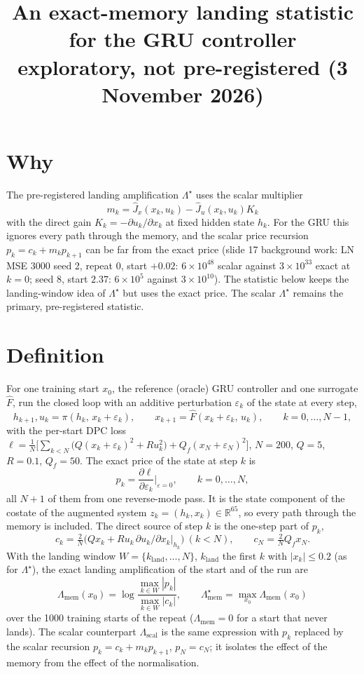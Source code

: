 \documentclass[11pt]{article}
\title{An exact-memory landing statistic for the GRU controller\\[2pt]\large exploratory, not pre-registered (3 November 2026)}
\author{}
\date{}
\begin{document}
\maketitle

\section*{Why}
The pre-registered landing amplification $\Lambda^\star$ uses the scalar multiplier
\[m_k=\hat J_x(x_k,u_k)-\hat J_u(x_k,u_k)K_k\]
with the direct gain $K_k=-\partial u_k/\partial x_k$ at fixed hidden state $h_k$. For the GRU this ignores every path through
the memory, and the scalar price recursion $p_k=c_k+m_kp_{k+1}$ can be far from the exact price (slide 17 background work:
LN MSE 3000 seed 2, repeat 0, start $+0.02$: $6\times10^{48}$ scalar against $3\times10^{33}$ exact at $k=0$; seed 8, start
$2.37$: $6\times10^{5}$ against $3\times10^{10}$). The statistic below keeps the landing-window idea of $\Lambda^\star$ but uses
the exact price. The scalar $\Lambda^\star$ remains the primary, pre-registered statistic.

\section*{Definition}
For one training start $x_0$, the reference (oracle) GRU controller and one surrogate $\hat F$, run the closed loop with an
additive perturbation $\varepsilon_k$ of the state at every step,
\[
h_{k+1},u_k=\pi(h_k,\,x_k+\varepsilon_k),\qquad x_{k+1}=\hat F(x_k+\varepsilon_k,\,u_k),\qquad k=0,\dots,N-1,
\]
with the per-start DPC loss
$\ell=\frac1N\big[\sum_{k<N}\big(Q(x_k+\varepsilon_k)^2+Ru_k^2\big)+Q_f(x_N+\varepsilon_N)^2\big]$, $N=200$, $Q=5$, $R=0.1$,
$Q_f=50$. The exact price of the state at step $k$ is
\[
p_k=\frac{\partial\ell}{\partial\varepsilon_k}\Big|_{\varepsilon=0},\qquad k=0,\dots,N,
\]
all $N+1$ of them from one reverse-mode pass. It is the state component of the costate of the augmented system
$z_k=(h_k,x_k)\in\mathbb R^{65}$, so every path through the memory is included. The direct source of step $k$ is the one-step
part of $p_k$,
\[
c_k=\tfrac2N\big(Qx_k+Ru_k\,\partial u_k/\partial x_k|_{h_k}\big)\ (k<N),\qquad c_N=\tfrac2N Q_fx_N .
\]
With the landing window $W=\{k_\mathrm{land},\dots,N\}$, $k_\mathrm{land}$ the first $k$ with $|x_k|\le0.2$ (as for
$\Lambda^\star$), the exact landing amplification of the start and of the run are
\[
\Lambda_{\mathrm{mem}}(x_0)=\log\frac{\max_{k\in W}|p_k|}{\max_{k\in W}|c_k|},\qquad
\Lambda^\star_{\mathrm{mem}}=\max_{x_0}\Lambda_{\mathrm{mem}}(x_0)
\]
over the 1000 training starts of the repeat ($\Lambda_{\mathrm{mem}}=0$ for a start that never lands). The scalar counterpart
$\Lambda_{\mathrm{scal}}$ is the same expression with $p_k$ replaced by the scalar recursion $p_k=c_k+m_kp_{k+1}$,
$p_N=c_N$; it isolates the effect of the memory from the effect of the normalisation.
\end{document}
